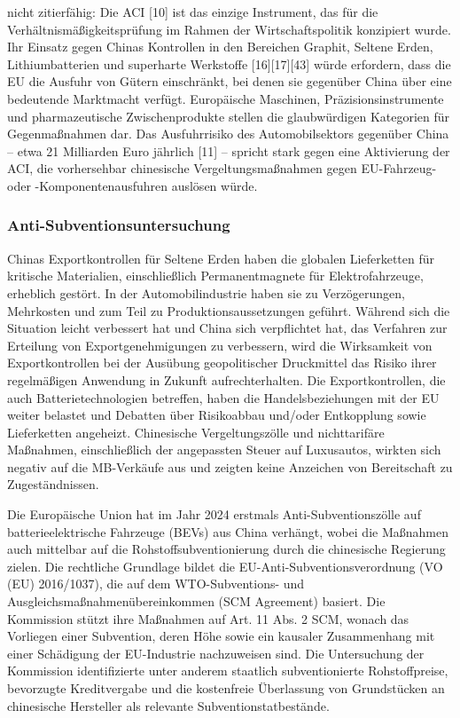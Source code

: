 \documentclass[12pt,a4paper,oneside]{book} %
\begin{document}
nicht zitierfähig: Die ACI [10] ist das einzige Instrument, das für die Verhältnismäßigkeitsprüfung im Rahmen der Wirtschaftspolitik konzipiert wurde. Ihr Einsatz gegen Chinas Kontrollen in den Bereichen Graphit, Seltene Erden, Lithiumbatterien und superharte Werkstoffe [16][17][43] würde erfordern, dass die EU die Ausfuhr von Gütern einschränkt, bei denen sie gegenüber China über eine bedeutende Marktmacht verfügt. Europäische Maschinen, Präzisionsinstrumente und pharmazeutische Zwischenprodukte stellen die glaubwürdigen Kategorien für Gegenmaßnahmen dar. Das Ausfuhrrisiko des Automobilsektors gegenüber China – etwa 21 Milliarden Euro jährlich [11] – spricht stark gegen eine Aktivierung der ACI, die vorhersehbar chinesische Vergeltungsmaßnahmen gegen EU-Fahrzeug- oder -Komponentenausfuhren auslösen würde.



\subsubsection{Anti-Subventionsuntersuchung}
Chinas Exportkontrollen für Seltene Erden haben die globalen Lieferketten für kritische Materialien, einschließlich Permanentmagnete für Elektrofahrzeuge, erheblich gestört. In der Automobilindustrie haben sie zu Verzögerungen, Mehrkosten und zum Teil zu Produktionsaussetzungen geführt. Während sich die Situation leicht verbessert hat und China sich verpflichtet hat, das Verfahren zur Erteilung von Exportgenehmigungen zu verbessern, wird die Wirksamkeit von Exportkontrollen bei der Ausübung geopolitischer Druckmittel das Risiko ihrer regelmäßigen Anwendung in Zukunft aufrechterhalten. Die Exportkontrollen, die auch Batterietechnologien betreffen, haben die Handelsbeziehungen mit der EU weiter belastet und Debatten über Risikoabbau und/oder Entkopplung sowie Lieferketten angeheizt. Chinesische Vergeltungszölle und nichttarifäre Maßnahmen, einschließlich der angepassten Steuer auf Luxusautos, wirkten sich negativ auf die MB-Verkäufe aus und zeigten keine Anzeichen von Bereitschaft zu Zugeständnissen.

Die Europäische Union hat im Jahr 2024 erstmals Anti-Subventionszölle auf batterieelektrische Fahrzeuge (BEVs) aus China verhängt, wobei die Maßnahmen auch mittelbar auf die Rohstoffsubventionierung durch die chinesische Regierung zielen. Die rechtliche Grundlage bildet die EU-Anti-Subventionsverordnung (VO (EU) 2016/1037), die auf dem WTO-Subventions- und Ausgleichsmaßnahmenübereinkommen (SCM Agreement) basiert. Die Kommission stützt ihre Maßnahmen auf Art. 11 Abs. 2 SCM, wonach das Vorliegen einer Subvention, deren Höhe sowie ein kausaler Zusammenhang mit einer Schädigung der EU-Industrie nachzuweisen sind. Die Untersuchung der Kommission identifizierte unter anderem staatlich subventionierte Rohstoffpreise, bevorzugte Kreditvergabe und die kostenfreie Überlassung von Grundstücken an chinesische Hersteller als relevante Subventionstatbestände.
\end{document}
